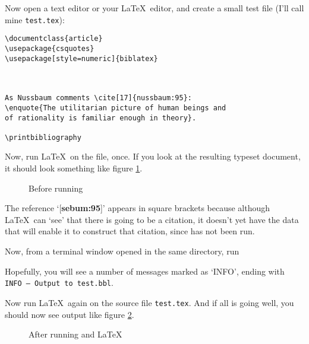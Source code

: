 Now open a text editor or your \LaTeX\ editor, and create a small test
file (I'll call mine \texttt{test.tex}):

\begin{verbatim}
\documentclass{article}
\usepackage{csquotes}
\usepackage[style=numeric]{biblatex}



As Nussbaum comments \cite[17]{nussbaum:95}: 
\enquote{The utilitarian picture of human beings and 
of rationality is familiar enough in theory}.

\printbibliography

\end{verbatim}

Now, run \LaTeX\ on the file, once. If you look at the resulting
typeset document, it should look something like figure
\ref{nussbaum1}.

\begin{figure}
\caption{Before running }\label{nussbaum1}
\end{figure}

The reference `[\textbf{sebum:95}]' appears in square brackets
because although \LaTeX\ can `see' that there is going to be a
citation, it doesn't yet have the data that will enable it to
construct that citation, since  has not been run.

Now, from a terminal window opened in the same directory, run

Hopefully, you will see a number of messages marked as `INFO', ending
with \texttt{INFO -- Output to test.bbl}.

Now run \LaTeX\ again on the source file \verb|test.tex|. And if all
is going well, you should now see output like figure \ref{nussbaum2}.

\begin{figure}
\caption{After running  and \LaTeX}\label{nussbaum2}
\end{figure}

